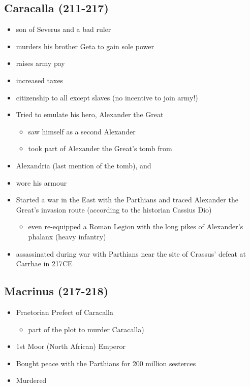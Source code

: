 \documentclass[12pt, twoside]{article}
\begin{document}
\subsection{Caracalla (211-217)}
\begin{itemize}
\item son of Severus and a bad ruler
\item murders his brother Geta to gain sole power
\item raises army pay
\item increased taxes
\item citizenship to all except slaves (no incentive to join army!)
\item Tried to emulate his hero, Alexander the Great
	\begin{itemize}
	\item saw himself as a second Alexander
	\item took part of Alexander the Great's tomb from
	\end{itemize}
\item Alexandria (last mention of the tomb), and
\item wore his armour
\item Started a war in the East with the Parthians and traced Alexander the Great’s invasion route (according to the historian Cassius Dio)
	\begin{itemize}
	\item even re-equipped a Roman Legion with the long pikes of Alexander’s phalanx (heavy infantry)
	\end{itemize}
\item assassinated during war with Parthians near the site of Crassus’ defeat at Carrhae in 217CE
\end{itemize}

\subsection{Macrinus (217-218)}
\begin{itemize}
\item Praetorian Prefect of Caracalla
	\begin{itemize}
	\item part of the plot to murder Caracalla)
	\end{itemize}
\item 1st Moor (North African) Emperor
\item Bought peace with the Parthians for 200 million sesterces
\item Murdered 
\end{itemize}
\end{document}
